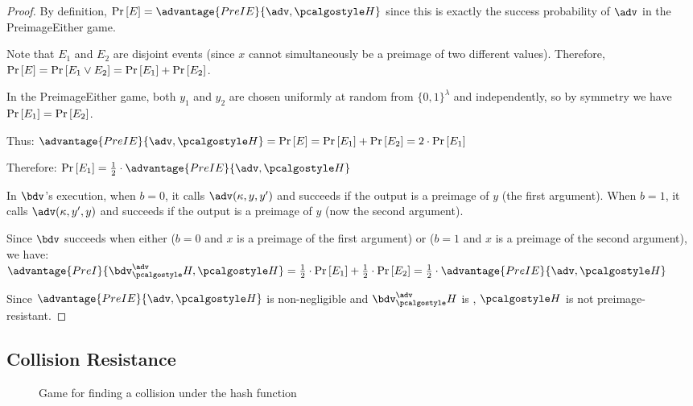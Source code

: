 \begin{proof}
  By definition, $\pr{E} = \advantage{PreIE}{\adv, \algo{H}}$ since this is exactly the success probability of $\adv$ in the PreimageEither game.
  
  Note that $E_1$ and $E_2$ are disjoint events (since $x$ cannot simultaneously be a preimage of two different values).
  Therefore, $\Pr\left[ E \right] = \Pr\left[ E_1 \vee E_2 \right] = \Pr\left[ E_1 \right] + \Pr\left[ E_2 \right]$.
  
  In the PreimageEither game, both $y_1$ and $y_2$ are chosen uniformly at random from $\{0,1\}^{\lambda}$ and independently, so by symmetry we have $\Pr\left[ E_1 \right] = \Pr\left[ E_2 \right]$.
  
  Thus: $\advantage{PreIE}{\adv, \algo{H}} = \pr{E} = \pr{E_1} + \pr{E_2} = 2 \cdot \pr{E_1}$
  
  Therefore: $\pr{E_1} = \frac{1}{2} \cdot \advantage{PreIE}{\adv, \algo{H}}$
  
  In $\bdv$'s execution, when $b = 0$, it calls $\adv(\kappa, y, y')$ and succeeds if the output is a preimage of $y$ (the first argument).
  When $b = 1$, it calls $\adv(\kappa, y', y)$ and succeeds if the output is a preimage of $y$ (now the second argument).
  
  Since $\bdv$ succeeds when either ($b = 0$ and $x$ is a preimage of the first argument) or ($b = 1$ and $x$ is a preimage of the second argument), we have:
  $\advantage{PreI}{\bdv^\adv_\algo{H}, \algo{H}} = \frac{1}{2} \cdot \pr{E_1} + \frac{1}{2} \cdot \pr{E_2} = \frac{1}{2} \cdot \advantage{PreIE}{\adv, \algo{H}}$
  
  Since $\advantage{PreIE}{\adv, \algo{H}}$ is non-negligible and $\bdv^\adv_\algo{H}$ is \ppt, $\algo{H}$ is not preimage-resistant.
\end{proof}


\subsection{Collision Resistance}

\begin{figure}[tbhp]
  \begin{center}
    \begin{tcolorbox}[width=8cm]
      \begin{pchstack}[center]
      \end{pchstack}
    \end{tcolorbox}
  \end{center}
  \caption{Game for finding a collision under the hash function \label{fig:break-hash-collision}}
\end{figure}

